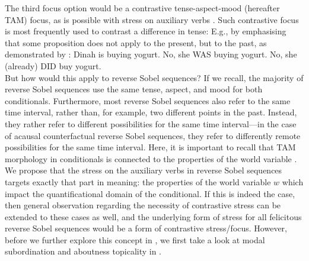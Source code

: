 The third focus option would be a contrastive tense-aspect-mood (hereafter TAM) focus, as is possible with stress on auxiliary verbs \parencite[p.~12f, footnote~3]{Goodhue2018}. Such contrastive focus is most frequently used to contrast a difference in tense: E.g., by emphasising that some proposition does not apply to the present, but to the past, as demonstrated by :
\pex
{} Dinah is buying yogurt.
\a {} No, she \MakeUppercase{was} buying yogurt.
\a {} No, she (already) \MakeUppercase{did} buy yogurt.\\\emptyfill\parencite[p.~13, footnote~3]{Goodhue2018}
\xe
But how would this apply to reverse Sobel sequences? If we recall, the majority of reverse Sobel sequences use the same tense, aspect, and mood for both conditionals. Furthermore, most reverse Sobel sequences also refer to the same time interval, rather than, for example, two different points in the past. Instead, they rather refer to different possibilities for the same time interval---in the case of acausal counterfactual reverse Sobel sequences,  they refer to differently remote possibilities for the same time interval. Here, it is important to recall that TAM morphology in conditionals is connected to the properties of the world variable \parencites{Palmer1986}{Iatridou2000}{Arregui2009}{Romero2014}[amongst others]{Schulz2014}. We propose that the stress on the auxiliary verbs in reverse Sobel sequences targets exactly that part in meaning: the properties of the world variable $w$ which impact the quantificational domain of the conditional. If this is indeed the case, then  general observation regarding the necessity of contrastive stress can be extended to these cases as well, and the underlying form of stress for all felicitous reverse Sobel sequences would be a form of contrastive stress/focus. However, before we further explore this concept in , we first take a look at modal subordination and aboutness topicality in .

